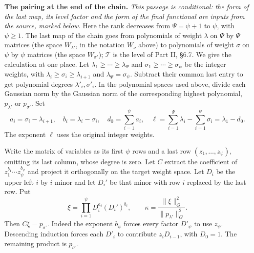 \documentclass[11pt,letterpaper]{article}
\begin{document}
\textbf{The pairing at the end of the chain.} \emph{This passage is conditional: the form of the last map,
its level factor and the form of the final functional are inputs from the source, marked below.}
Here the rank decreases from $\Psi=\psi+1$ to $\psi$, with $\psi\ge1$. The last map of the chain goes from
polynomials of weight $\lambda$ on $\Psi$ by $\Psi$ matrices (the space $W_{\lambda'}$, in the notation
$W_\nu$ above) to polynomials of weight $\sigma$ on $\psi$ by $\psi$ matrices (the space $W_{\sigma'}$);
$\mathcal T$ is the level of Part II, \S6.7. We give the calculation
at one place. Let $\lambda_1\ge\cdots\ge\lambda_\Psi$ and
$\sigma_1\ge\cdots\ge\sigma_\psi$ be the integer weights, with
$\lambda_i\ge\sigma_i\ge\lambda_{i+1}$ and $\lambda_\Psi=\sigma_\psi$.
Subtract their common last entry to get polynomial degrees
$\lambda'_i,\sigma'_i$. In the polynomial spaces used above, divide each Gaussian norm by the Gaussian
norm of the corresponding highest polynomial, $p_{\lambda'}$ or $p_{\sigma'}$. Set
\begin{equation}\label{D:181}
 a_i=\sigma_i-\lambda_{i+1},\quad b_i=\lambda_i-\sigma_i,\quad
 d_0=\sum_{i=1}^\psi a_i,\quad
 \ell=\sum_{i=1}^\Psi\lambda_i-\sum_{i=1}^\psi\sigma_i=\lambda_1-d_0 .
\end{equation}
The exponent $\ell$ uses the original integer weights.

Write the matrix of variables as its first $\psi$ rows and a last row
$(z_1,\ldots,z_\psi)$, omitting its last column, whose degree is zero.
Let $C$ extract the coefficient of $z_1^{b_1}\cdots z_\psi^{b_\psi}$ and
project it orthogonally on the target weight space. Let $D_i$ be the
upper left $i$ by $i$ minor and let $D_i'$ be that minor with row $i$
replaced by the last row. Put
\begin{equation}\label{D:182}
 \xi=\prod_{i=1}^\psi D_i^{a_i}(D_i')^{b_i},\qquad
 \kappa=\frac{\|\xi\|_G^2}{\|p_{\lambda'}\|_G^2}.
\end{equation}
Then $C\xi=p_{\sigma'}$. Indeed the exponent $b_\psi$ forces every factor
$D'_\psi$ to use $z_\psi$. Descending induction forces each $D'_i$ to
contribute $z_iD_{i-1}$, with $D_0=1$. The remaining product is
$p_{\sigma'}$.
\end{document}
